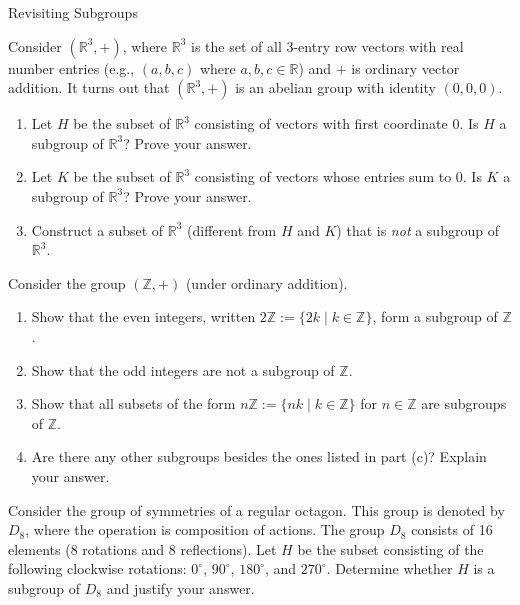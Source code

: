 \begin{section}{Revisiting Subgroups}
\begin{remark}
\end{remark}
\begin{exercise}
Consider $(\mathbb{R}^3,+)$, where $\mathbb{R}^3$ is the set of all 3-entry row vectors with real number entries (e.g., $(a,b,c)$ where $a,b,c\in\mathbb{R}$) and $+$ is ordinary vector addition.  It turns out that $(\mathbb{R}^3,+)$ is an abelian group with identity $(0,0,0)$.  
\begin{enumerate}[label=\rm{(\alph*)}]
\item Let $H$ be the subset of $\mathbb{R}^3$ consisting of vectors with first coordinate 0.  Is $H$ a subgroup of $\mathbb{R}^3$?  Prove your answer.
\item Let $K$ be the subset of $\mathbb{R}^3$ consisting of vectors whose entries sum to 0.  Is $K$ a subgroup of $\mathbb{R}^3$?  Prove your answer.
\item Construct a subset of $\mathbb{R}^3$ (different from $H$ and $K$) that is \emph{not} a subgroup of $\mathbb{R}^3$.
\end{enumerate}
\end{exercise}

\begin{exercise}\label{exer:nZ}
Consider the group $(\mathbb{Z},+)$ (under ordinary addition).
\begin{enumerate}[label=\rm{(\alph*)}]
\item Show that the even integers, written $2\mathbb{Z}:=\{2k\mid k\in\mathbb{Z}\}$, form a subgroup of $\mathbb{Z}$.
\item Show that the odd integers are not a subgroup of $\mathbb{Z}$.
\item Show that all subsets of the form $n\mathbb{Z}:=\{nk\mid k\in\mathbb{Z}\}$ for $n\in\mathbb{Z}$ are subgroups of $\mathbb{Z}$.
\item Are there any other subgroups besides the ones listed in part (c)?  Explain your answer.
\end{enumerate}
\end{exercise}

\begin{exercise}
Consider the group of symmetries of a regular octagon.  This group is denoted by $D_8$, where the operation is composition of actions.  The group $D_8$ consists of 16 elements (8 rotations and 8 reflections).  Let $H$ be the subset consisting of the following clockwise rotations: $0^\circ$, $90^\circ$, $180^\circ$, and $270^\circ$.  Determine whether $H$ is a subgroup of $D_8$ and justify your answer.
\end{exercise}


\end{section}
